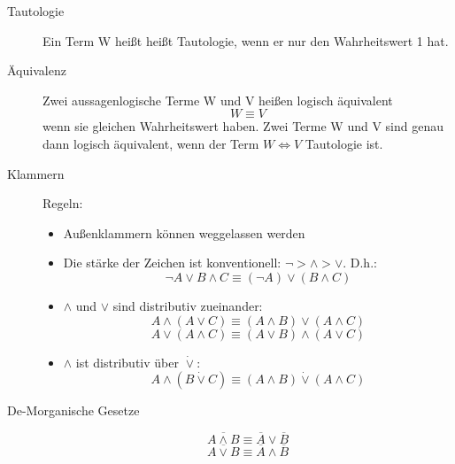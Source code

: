 \begin{description}
    \item[Tautologie] Ein Term W heißt heißt Tautologie, wenn er nur den Wahrheitswert 1 hat.
    \item[Äquivalenz] Zwei aussagenlogische Terme W und V heißen logisch äquivalent $$W \equiv V$$ wenn sie gleichen Wahrheitswert haben. Zwei Terme W und V sind genau dann logisch äquivalent, wenn der Term $W\Leftrightarrow V$ Tautologie ist.
    \item[Klammern] Regeln:
    \begin{itemize}
        \item Außenklammern können weggelassen werden
        \item Die stärke der Zeichen ist konventionell: $\neg > \wedge > \vee$. D.h.:
        $$\neg A \vee B \wedge C \equiv (\neg A) \vee (B \wedge C)$$
        \item $\wedge$ und $\vee$ sind distributiv zueinander:
        $$A \wedge (A \vee C) \equiv (A \wedge B) \vee (A \wedge C)$$
        $$A \vee (A \wedge C) \equiv (A \vee B) \wedge (A \vee C)$$
        \item $\wedge$ ist distributiv über $\dot{\vee}$:
        $$A \wedge (B \dot{\vee} C) \equiv (A \wedge B) \dot{\vee} (A \wedge C)$$
    \end{itemize}
    \item[De-Morganische Gesetze] $$\overline{A \wedge B} \equiv \overline{A} \vee \overline{B}$$ $$\overline{A \vee B} \equiv \overline{A} \wedge \overline{B}$$
\end{description}
